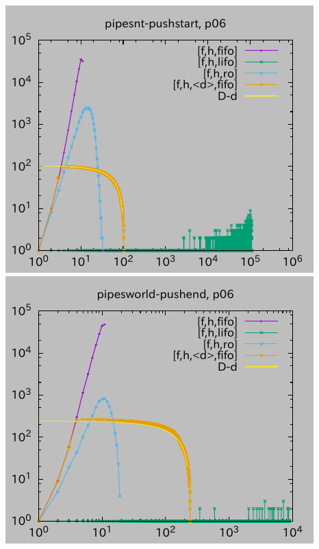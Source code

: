 \includegraphics{img/depth/pipesnt-pushstart/p06.pdf}
\includegraphics{img/depth/pipesworld-pushend/p06.pdf}
